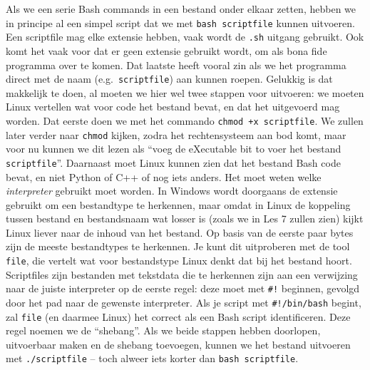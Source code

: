 Als we een serie Bash commands in een bestand onder elkaar zetten, hebben we in principe al een simpel script dat we met \texttt{bash\ scriptfile} kunnen uitvoeren. Een scriptfile mag elke extensie hebben, vaak wordt de \texttt{.sh} uitgang gebruikt. Ook komt het vaak voor dat er geen extensie gebruikt wordt, om als bona fide programma over te komen. Dat laatste heeft vooral zin als we het programma direct met de naam (e.g.~\texttt{scriptfile}) aan kunnen roepen. Gelukkig is dat makkelijk te doen, al moeten we hier wel twee stappen voor uitvoeren: we moeten Linux vertellen wat voor code het bestand bevat, en dat het uitgevoerd mag worden. Dat eerste doen we met het commando \texttt{chmod\ +x\ scriptfile}. We zullen later verder naar \texttt{chmod} kijken, zodra het rechtensysteem aan bod komt, maar voor nu kunnen we dit lezen als ``voeg de eXecutable bit to voer het bestand \texttt{scriptfile}''. Daarnaast moet Linux kunnen zien dat het bestand Bash code bevat, en niet Python of C++ of nog iets anders. Het moet weten welke \emph{interpreter} gebruikt moet worden. In Windows wordt doorgaans de extensie gebruikt om een bestandtype te herkennen, maar omdat in Linux de koppeling tussen bestand en bestandsnaam wat losser is (zoals we in Les 7 zullen zien) kijkt Linux liever naar de inhoud van het bestand. Op basis van de eerste paar bytes zijn de meeste bestandtypes te herkennen. Je kunt dit uitproberen met de tool \texttt{file}, die vertelt wat voor bestandstype Linux denkt dat bij het bestand hoort. Scriptfiles zijn bestanden met tekstdata die te herkennen zijn aan een verwijzing naar de juiste interpreter op de eerste regel: deze moet met \texttt{\#!} beginnen, gevolgd door het pad naar de gewenste interpreter. Als je script met \texttt{\#!/bin/bash} begint, zal \texttt{file} (en daarmee Linux) het correct als een Bash script identificeren. Deze regel noemen we de ``shebang''. Als we beide stappen hebben doorlopen, uitvoerbaar maken en de shebang toevoegen, kunnen we het bestand uitvoeren met \texttt{./scriptfile} -- toch alweer iets korter dan \texttt{bash\ scriptfile}.

